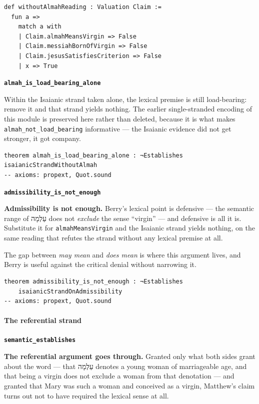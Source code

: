 \documentclass[11pt]{article}
\begin{document}
{\small\begin{verbatim}
def withoutAlmahReading : Valuation Claim :=
  fun a =>
    match a with
    | Claim.almahMeansVirgin => False
    | Claim.messiahBornOfVirgin => False
    | Claim.jesusSatisfiesCriterion => False
    | x => True
\end{verbatim}}
\par\medskip\noindent\textbf{\texttt{almah\_\allowbreak{}is\_\allowbreak{}load\_\allowbreak{}bearing\_\allowbreak{}alone}}\par\nobreak\noindent
Within the Isaianic strand taken alone, the lexical premise is still load-bearing: remove it and that strand yields nothing. The earlier single-stranded encoding of this module is preserved here rather than deleted, because it is what makes \texttt{almah\_\allowbreak{}not\_\allowbreak{}load\_\allowbreak{}bearing} informative — the Isaianic evidence did not get stronger, it got company.

{\small\begin{verbatim}
theorem almah_is_load_bearing_alone : ¬Establishes isaianicStrandWithoutAlmah
-- axioms: propext, Quot.sound
\end{verbatim}}
\par\medskip\noindent\textbf{\texttt{admissibility\_\allowbreak{}is\_\allowbreak{}not\_\allowbreak{}enough}}\par\nobreak\noindent
\textbf{Admissibility is not enough.} Berry’s lexical point is defensive — the semantic range of עַלְמָה does not \emph{exclude} the sense “virgin” — and defensive is all it is. Substitute it for \texttt{almah\allowbreak{}Means\allowbreak{}Virgin} and the Isaianic strand yields nothing, on the same reading that refutes the strand without any lexical premise at all.

The gap between \emph{may mean} and \emph{does mean} is where this argument lives, and Berry is useful against the critical denial without narrowing it.

{\small\begin{verbatim}
theorem admissibility_is_not_enough : ¬Establishes
    isaianicStrandOnAdmissibility
-- axioms: propext, Quot.sound
\end{verbatim}}
\paragraph*{The referential strand}
\leavevmode\par\nobreak
\par\medskip\noindent\textbf{\texttt{semantic\_\allowbreak{}establishes}}\par\nobreak\noindent
\textbf{The referential argument goes through.} Granted only what both sides grant about the word — that עַלְמָה denotes a young woman of marriageable age, and that being a virgin does not exclude a woman from that denotation — and granted that Mary was such a woman and conceived as a virgin, Matthew’s claim turns out not to have required the lexical sense at all.
\end{document}
